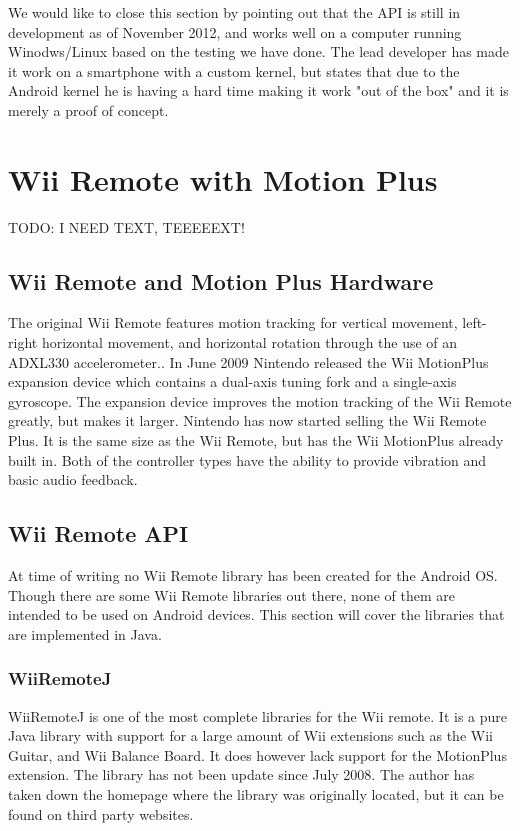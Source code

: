 We would like to close this section by pointing out that the API is still in development as of November 2012, and works well on a computer running Winodws/Linux based on the testing we have done. The lead developer has made it work on a smartphone with a custom kernel, but states that due to the Android kernel he is having a hard time making it work "out of the box" and it is merely a proof of concept.

\section{Wii Remote with Motion Plus}
TODO: I NEED TEXT, TEEEEEXT!

\subsection{Wii Remote and Motion Plus Hardware}
The original Wii Remote features motion tracking for vertical movement, left-right horizontal movement, and horizontal rotation through the use of an ADXL330 accelerometer.\cite{wiiAccelerometer}. In June 2009 Nintendo released the Wii MotionPlus expansion device which contains a dual-axis tuning fork and a single-axis gyroscope\cite{wiiMotionPlus}. The expansion device improves the motion tracking of the Wii Remote greatly, but makes it larger. Nintendo has now started selling the Wii Remote Plus. It is the same size as the Wii Remote, but has the Wii MotionPlus already built in. Both of the controller types have the ability to provide vibration and basic audio feedback.

\subsection{Wii Remote API}
At time of writing no Wii Remote library has been created for the Android OS. Though there are some Wii Remote libraries out there, none of them are intended to be used on Android devices. This section will cover the libraries that are implemented in Java.

\subsubsection{WiiRemoteJ}
WiiRemoteJ is one of the most complete libraries for the Wii remote. It is a pure Java library with support for a large amount of Wii extensions such as the Wii Guitar, and Wii Balance Board. It does however lack support for the MotionPlus extension. The library has not been update since July 2008. The author has taken down the homepage where the library was originally located, but it can be found on third party websites. \cite{WiiRemoteJ}

